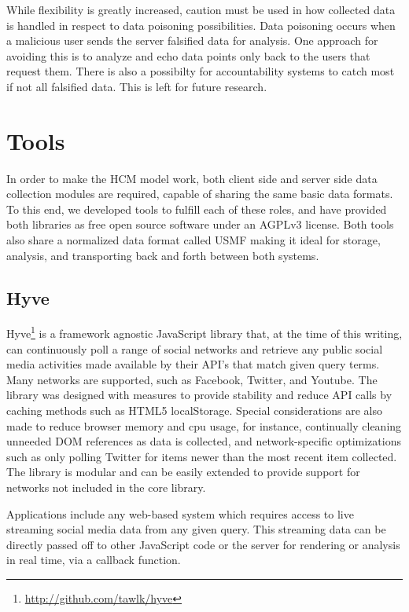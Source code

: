 \documentclass[letterpaper]{article}
\begin{document}
While flexibility is greatly increased, caution must be used in how collected data is handled in respect to data poisoning possibilities. Data poisoning occurs when a malicious user sends the server falsified data for analysis. One approach for avoiding this is to analyze and echo data points only back to the users that request them. There is also a possibilty for accountability systems to catch most if not all falsified data. This is left for future research.

\section{Tools}

In order to make the HCM model work, both client side and server side data collection modules are required, capable of sharing the same basic data formats. To this end, we developed tools to fulfill each of these roles, and have provided both libraries as free open source software under an AGPLv3 license. Both tools also share a normalized data format called USMF making it ideal for storage, analysis, and transporting back and forth between both systems.

\subsection{Hyve}

Hyve\footnote{\url{http://github.com/tawlk/hyve}} is a framework agnostic JavaScript library that, at the time of this writing, can continuously poll a range of social networks and retrieve any public social media activities made available by their API's that match given query terms. Many networks are supported, such as Facebook, Twitter, and Youtube. The library was designed with measures to provide stability and reduce API calls by caching methods such as HTML5 localStorage. Special considerations are also made to reduce browser memory and cpu usage, for instance, continually cleaning unneeded DOM references as data is collected, and network-specific optimizations such as only polling Twitter for items newer than the most recent item collected. The library is modular and can be easily extended to provide support for networks not included in the core library.

Applications include any web-based system which requires access to live streaming social media data from any given query.  This streaming data can be directly passed off to other JavaScript code or the server for rendering or analysis in real time, via a callback function.
\end{document}

